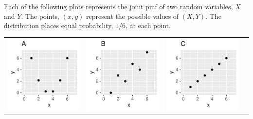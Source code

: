  
\begin{frame}
  \begin{block}{\example}
  Each of the following plots represents the joint pmf of two random variables, $X$ and $Y$. The points, $(x,y)$ represent the possible values of $(X,Y)$. The distribution places equal probability, $1/6$, at each point.

    \begin{center}
      \begin{tabular}{cccc}
        \includegraphics[height=.35\textheight]{figure/exercise-26-2-4} &
        \includegraphics[height=.35\textheight]{figure/exercise-26-2-2} &
        \includegraphics[height=.35\textheight]{figure/exercise-26-2-1} &

\end{tabular}
\end{center}
\end{block}
\end{frame}
